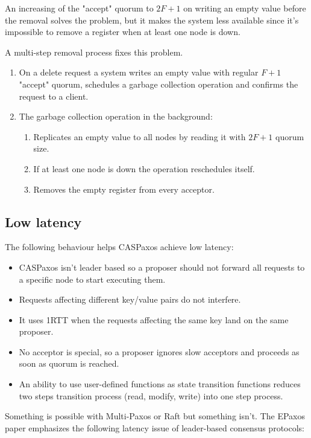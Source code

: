 \documentclass[12pt]{article}
\theoremstyle{definition}
\begin{document}
An increasing of the "accept" quorum to $2F+1$ on writing an empty value before the removal solves the problem, but it makes the system less available since it's impossible to remove a register when at least one node is down.

A multi-step removal process fixes this problem.

\begin{enumerate}
  \item On a delete request a system writes an empty value with regular $F+1$ "accept" quorum, schedules a garbage collection operation and confirms the request to a client.
  \item The garbage collection operation in the background:
  \begin{enumerate}
    \item Replicates an empty value to all nodes by reading it with $2F+1$ quorum size.
    \item If at least one node is down the operation reschedules itself.
    \item Removes the empty register from every acceptor.
  \end{enumerate}
\end{enumerate}

\newpage

\subsection{Low latency}

The following behaviour helps CASPaxos achieve low latency:
\begin{itemize}
  \item CASPaxos isn't leader based so a proposer should not forward all requests to a specific node to start executing them.
  \item Requests affecting different key/value pairs do not interfere.
  \item It uses 1RTT when the requests affecting the same key land on the same proposer.
  \item No acceptor is special, so a proposer ignores slow acceptors and proceeds as soon as quorum is reached.
  \item An ability to use user-defined functions as state transition functions reduces two steps transition process (read, modify, write) into one step process.
\end{itemize}

Something is possible with Multi-Paxos or Raft but something isn't. The EPaxos paper emphasizes the following latency issue of leader-based consensus protocols:
\end{document}
